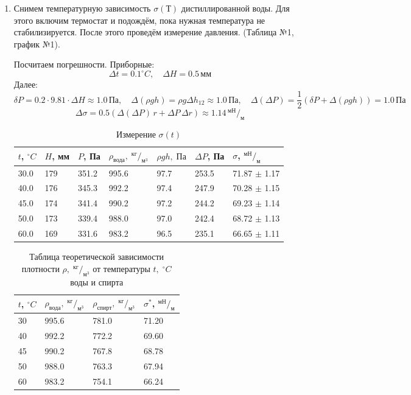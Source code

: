 \documentclass[a4paper,12pt]{article}
\begin{document}
\begin{enumerate}
		\item Снимем температурную зависимость $\sigma (Т)$ дистиллированной воды. Для этого включим термостат и подождём, пока нужная температура не стабилизируется. После этого проведём измерение давления. (Таблица №1, график №1).
		
		Посчитаем погрешности. Приборные:
		$$\Delta t = 0.1^\circ C,\quad \Delta H = 0.5 \, мм$$
		Далее:
		$$\delta P = 0.2\cdot9.81 \cdot\Delta H \approx 1.0 \, Па,\quad \Delta (\rho gh) = \rho g \Delta h_{12} \approx 1.0 \, Па,\quad \Delta(\Delta P) = \frac{1}{2}(\delta P + \Delta (\rho gh)) = 1.0 \, Па$$
		$$\Delta \sigma = 0.5\left(\Delta(\Delta P) \, r +  \Delta P \, \Delta r\right) \approx 1.14 \, ^{мН}/_{м}$$
		

		\begin{table}[h!] 
			\caption{Измерение $\sigma (t)$}
			\begin{center}
				\begin{tabular}{|*{7}{l|}}
					\hline
					$t$, $^\circ C$ & $H$, мм & $P$, Па & $\rho_{вода},\;^{кг}/_{м^{3}}$ & $\rho gh,\; Па$ & $\Delta P$, Па & $\sigma$, $^{мН}/_{м}$ \\ \hline
					30.0 & 179 & 351.2 & 995.6 & 97.7 & 253.5 & 71.87 $\pm$ 1.17 \\ \hline
					40.0 & 176 & 345.3 & 992.2 & 97.4 & 247.9 & 70.28 $\pm$ 1.15  \\ \hline
					45.0 & 174 & 341.4 & 990.2 & 97.2 & 244.2 & 69.23 $\pm$ 1.14  \\ \hline
					50.0 & 173 & 339.4 & 988.0 & 97.0 & 242.4 & 68.72 $\pm$ 1.13  \\ \hline
					60.0 & 169 & 331.6 & 983.2 & 96.5 & 235.1 & 66.65 $\pm$ 1.11  \\ \hline
				\end{tabular}
			\end{center}
		\end{table}
	
	
		\begin{table}[h!] 
			\caption{Таблица теоретической зависимости плотности $\rho,\;^{кг}/_{м^{3}}$ от температуры $t,\;^\circ C$ воды и спирта}
			\begin{center}
				\begin{tabular}{|*{4}{l|}}
					\hline
					$t$, $^\circ C$ & $\rho_{вода},\;^{кг}/_{м^{3}}$ & $\rho_{спирт},\;^{кг}/_{м^{3}}$ & $\sigma^*$, $^{мН}/_{м}$ \\ \hline
					30 & 995.6 & 781.0 & 71.20 \\ \hline
					40 & 992.2 & 772.2 & 69.60 \\ \hline
					45 & 990.2 & 767.8 & 68.78 \\ \hline
					50 & 988.0 & 763.3 & 67.94 \\ \hline
					60 & 983.2 & 754.1 & 66.24 \\ \hline
				\end{tabular}
			\end{center}
		\end{table}
	

\end{enumerate}
\end{document}
